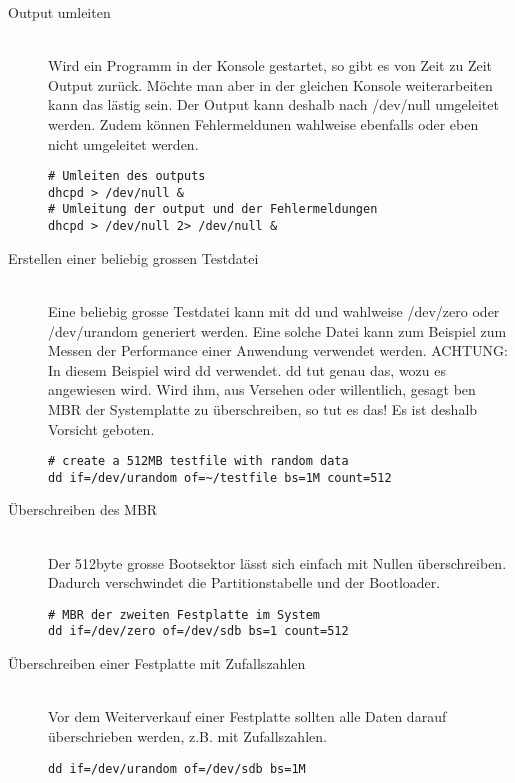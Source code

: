 \begin{description}
\item[Output umleiten] \hfill \\
Wird ein Programm in der Konsole gestartet, so gibt es von Zeit zu Zeit Output zur\"uck. M\"ochte man aber in der gleichen Konsole weiterarbeiten kann das l\"astig sein. Der Output kann deshalb nach /dev/null umgeleitet werden. Zudem k\"onnen Fehlermeldunen wahlweise ebenfalls oder eben nicht umgeleitet werden.
\begin{lstlisting}
# Umleiten des outputs
dhcpd > /dev/null &
# Umleitung der output und der Fehlermeldungen
dhcpd > /dev/null 2> /dev/null &
\end{lstlisting}
\item[Erstellen einer beliebig grossen Testdatei] \hfill \\
Eine beliebig grosse Testdatei kann mit dd und wahlweise /dev/zero oder /dev/urandom generiert werden. Eine solche Datei kann zum Beispiel zum Messen der Performance einer Anwendung verwendet werden. ACHTUNG: In diesem Beispiel wird dd verwendet. dd tut genau das, wozu es angewiesen wird. Wird ihm, aus Versehen oder willentlich, gesagt ben MBR der Systemplatte zu \"uberschreiben, so tut es das! Es ist deshalb Vorsicht geboten.
\begin{lstlisting}
# create a 512MB testfile with random data
dd if=/dev/urandom of=~/testfile bs=1M count=512
\end{lstlisting}
\item[\"Uberschreiben des MBR] \hfill \\
Der 512byte grosse Bootsektor l\"asst sich einfach mit Nullen \"uberschreiben. Dadurch verschwindet die Partitionstabelle und der Bootloader.
\begin{lstlisting}
# MBR der zweiten Festplatte im System
dd if=/dev/zero of=/dev/sdb bs=1 count=512
\end{lstlisting}
\item[\"Uberschreiben einer Festplatte mit Zufallszahlen] \hfill \\
Vor dem Weiterverkauf einer Festplatte sollten alle Daten darauf \"uberschrieben werden, z.B. mit Zufallszahlen.
\begin{lstlisting}
dd if=/dev/urandom of=/dev/sdb bs=1M
\end{lstlisting}
\end{description}
